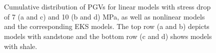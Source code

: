 \clearpage
{}
\begin{figure}[!ht]
     \hfil%
     \\[\baselineskip]%
     \hfil%
     \\[\baselineskip]

    \caption{Cumulative distribution of PGVs for linear models with stress drop of 7 (a and c) and 10 (b and d) MPa, as well as nonlinear models and the corresponding EKS models. The top row (a and b) depicts models with sandstone and the bottom row (c and d) shows models with shale.}
    \label{fig:eks-5}
\end{figure}

